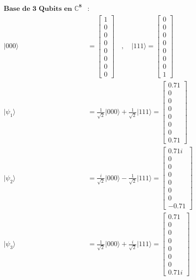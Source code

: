 \documentclass[11pt]{article}
\begin{document}
    $\displaystyle 
\begin{aligned}
\mathbf{\text{Base de 3 Qubits en } \mathbb{C}^8} &:\\
\vert{000}\rangle &= \begin{bmatrix} 1 \\ 0 \\ 0 \\ 0 \\ 0 \\ 0 \\ 0 \\ 0 \end{bmatrix} \quad , \quad \vert{111}\rangle = \begin{bmatrix} 0 \\ 0 \\ 0 \\ 0 \\ 0 \\ 0 \\ 0 \\ 1 \end{bmatrix} \\[1.5em]
\vert{\psi_1}\rangle &= \frac{1}{\sqrt{2}}\vert{000}\rangle + \frac{1}{\sqrt{2}}\vert{111}\rangle = \begin{bmatrix} 0.71 \\ 0 \\ 0 \\ 0 \\ 0 \\ 0 \\ 0 \\ 0.71 \end{bmatrix} \\[1em]
\vert{\psi_2}\rangle &= \frac{i}{\sqrt{2}}\vert{000}\rangle - \frac{1}{\sqrt{2}}\vert{111}\rangle = \begin{bmatrix} 0.71i \\ 0 \\ 0 \\ 0 \\ 0 \\ 0 \\ 0 \\ -0.71 \end{bmatrix} \\[1em]
\vert{\psi_3}\rangle &= \frac{1}{\sqrt{2}}\vert{000}\rangle + \frac{i}{\sqrt{2}}\vert{111}\rangle = \begin{bmatrix} 0.71 \\ 0 \\ 0 \\ 0 \\ 0 \\ 0 \\ 0 \\ 0.71i \end{bmatrix}
\end{aligned}
$

    

    
    
    
\end{document}
